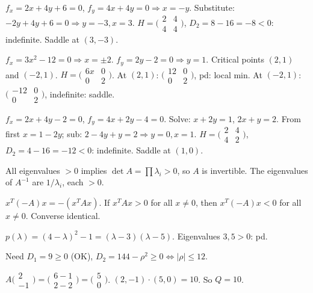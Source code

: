 \begin{solutions}
    \item $f_{x} = 2 x + 4 y + 6 = 0$, $f_{y} = 4 x + 4 y = 0 \Rightarrow x = -y$. Substitute: $-2 y + 4 y + 6 = 0 \Rightarrow y = -3, x = 3$. $H = \bigl(\begin{smallmatrix} 2 & 4 \\ 4 & 4 \end{smallmatrix}\bigr)$, $D_{2} = 8 - 16 = -8 < 0$: indefinite. Saddle at $(3, -3)$.
    \item $f_{x} = 3 x^{2} - 12 = 0 \Rightarrow x = \pm 2$. $f_{y} = 2 y - 2 = 0 \Rightarrow y = 1$. Critical points $(2, 1)$ and $(-2, 1)$. $H = \bigl(\begin{smallmatrix} 6 x & 0 \\ 0 & 2 \end{smallmatrix}\bigr)$. At $(2, 1)$: $\bigl(\begin{smallmatrix} 12 & 0 \\ 0 & 2 \end{smallmatrix}\bigr)$, pd: local min. At $(-2, 1)$: $\bigl(\begin{smallmatrix} -12 & 0 \\ 0 & 2 \end{smallmatrix}\bigr)$, indefinite: saddle.
    \item $f_{x} = 2 x + 4 y - 2 = 0$, $f_{y} = 4 x + 2 y - 4 = 0$. Solve: $x + 2 y = 1$, $2 x + y = 2$. From first $x = 1 - 2 y$; sub: $2 - 4 y + y = 2 \Rightarrow y = 0, x = 1$. $H = \bigl(\begin{smallmatrix} 2 & 4 \\ 4 & 2 \end{smallmatrix}\bigr)$, $D_{2} = 4 - 16 = -12 < 0$: indefinite. Saddle at $(1, 0)$.
    \item All eigenvalues $> 0$ implies $\det A = \prod \lambda_{i} > 0$, so $A$ is invertible. The eigenvalues of $A^{-1}$ are $1/\lambda_{i}$, each $> 0$.
    \item $x^{T}(-A)x = -(x^{T} A x)$. If $x^{T} A x > 0$ for all $x \neq 0$, then $x^{T}(-A)x < 0$ for all $x \neq 0$. Converse identical.
    \item $p(\lambda) = (4 - \lambda)^{2} - 1 = (\lambda - 3)(\lambda - 5)$. Eigenvalues $3, 5 > 0$: pd.
    \item Need $D_{1} = 9 \ge 0$ (OK), $D_{2} = 144 - \rho^{2} \ge 0 \Leftrightarrow |\rho| \le 12$.
    \item $A \bigl(\begin{smallmatrix} 2 \\ -1 \end{smallmatrix}\bigr) = \bigl(\begin{smallmatrix} 6 - 1 \\ 2 - 2 \end{smallmatrix}\bigr) = \bigl(\begin{smallmatrix} 5 \\ 0 \end{smallmatrix}\bigr)$. $(2, -1) \cdot (5, 0) = 10$. So $Q = 10$.

\end{solutions}
